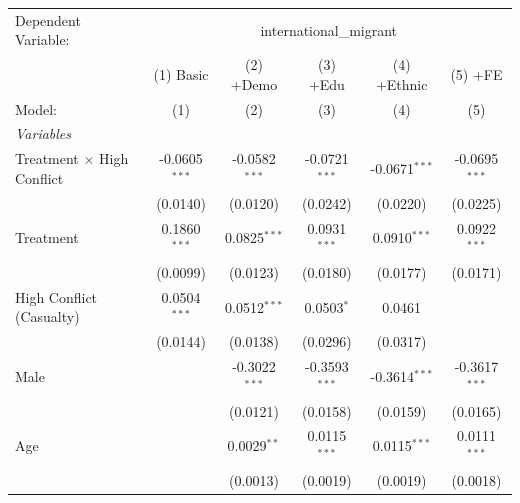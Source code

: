 
\begingroup
\centering
\begin{tabular}{lccccc}
   \tabularnewline \midrule \midrule
   Dependent Variable: & \multicolumn{5}{c}{international\_migrant}\\
                                     & (1) Basic       & (2) +Demo                      & (3) +Edu                & (4) +Ethnic             & (5) +FE \\   
   Model:                            & (1)             & (2)                            & (3)                     & (4)                     & (5)\\  
   \midrule
   \emph{Variables}\\
   Treatment $\times$ High Conflict  & -0.0605$^{***}$ & -0.0582$^{***}$                & -0.0721$^{***}$         & -0.0671$^{***}$         & -0.0695$^{***}$\\   
                                     & (0.0140)        & (0.0120)                       & (0.0242)                & (0.0220)                & (0.0225)\\   
   Treatment                         & 0.1860$^{***}$  & 0.0825$^{***}$                 & 0.0931$^{***}$          & 0.0910$^{***}$          & 0.0922$^{***}$\\   
                                     & (0.0099)        & (0.0123)                       & (0.0180)                & (0.0177)                & (0.0171)\\   
   High Conflict (Casualty)          & 0.0504$^{***}$  & 0.0512$^{***}$                 & 0.0503$^{*}$            & 0.0461                  &   \\   
                                     & (0.0144)        & (0.0138)                       & (0.0296)                & (0.0317)                &   \\   
   Male                              &                 & -0.3022$^{***}$                & -0.3593$^{***}$         & -0.3614$^{***}$         & -0.3617$^{***}$\\   
                                     &                 & (0.0121)                       & (0.0158)                & (0.0159)                & (0.0165)\\   
   Age                               &                 & 0.0029$^{**}$                  & 0.0115$^{***}$          & 0.0115$^{***}$          & 0.0111$^{***}$\\   
                                     &                 & (0.0013)                       & (0.0019)                & (0.0019)                & (0.0018)\\   

\end{tabular}
